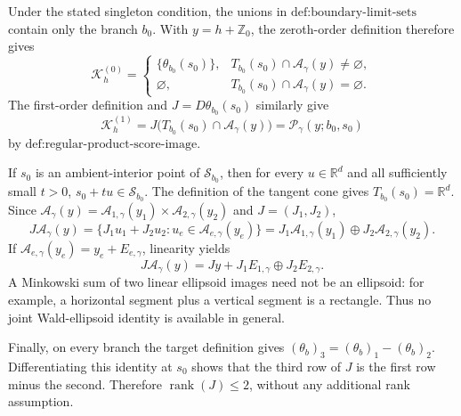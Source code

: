 Under the stated singleton condition, the unions in \(\text{def:boundary-limit-sets}\) contain only the branch \(b_0\).  With \(y=h+\mathbb Z_0\), the zeroth-order definition therefore gives
\[
 \mathcal K_h^{(0)}=
 \begin{cases}
   \{\theta_{b_0}(s_0)\},&
   T_{b_0}(s_0)\cap\mathcal A_\gamma(y)\ne\varnothing,\\
   \varnothing,&
   T_{b_0}(s_0)\cap\mathcal A_\gamma(y)=\varnothing.
 \end{cases}
\]
The first-order definition and \(J=D\theta_{b_0}(s_0)\) similarly give
\[
 \mathcal K_h^{(1)}
 =J\bigl(T_{b_0}(s_0)\cap\mathcal A_\gamma(y)\bigr)
 =\mathcal P_\gamma(y;b_0,s_0)
\]
by \(\text{def:regular-product-score-image}\).

If \(s_0\) is an ambient-interior point of \(\mathcal S_{b_0}\), then for every \(u\in\mathbb R^d\) and all sufficiently small \(t>0\), \(s_0+tu\in\mathcal S_{b_0}\).  The definition of the tangent cone gives \(T_{b_0}(s_0)=\mathbb R^d\).  Since \(\mathcal A_\gamma(y)=\mathcal A_{1,\gamma}(y_1)\times\mathcal A_{2,\gamma}(y_2)\) and \(J=(J_1,J_2)\),
\[
 J\mathcal A_\gamma(y)
 =\{J_1u_1+J_2u_2:u_e\in\mathcal A_{e,\gamma}(y_e)\}
 =J_1\mathcal A_{1,\gamma}(y_1)
    \oplus J_2\mathcal A_{2,\gamma}(y_2).
\]
If \(\mathcal A_{e,\gamma}(y_e)=y_e+E_{e,\gamma}\), linearity yields
\[
 J\mathcal A_\gamma(y)
 =Jy+J_1E_{1,\gamma}\oplus J_2E_{2,\gamma}.
\]
A Minkowski sum of two linear ellipsoid images need not be an ellipsoid: for example, a horizontal segment plus a vertical segment is a rectangle.  Thus no joint Wald-ellipsoid identity is available in general.

Finally, on every branch the target definition gives \((\theta_b)_3=(\theta_b)_1-(\theta_b)_2\).  Differentiating this identity at \(s_0\) shows that the third row of \(J\) is the first row minus the second.  Therefore \(\operatorname{rank}(J)\le2\), without any additional rank assumption.